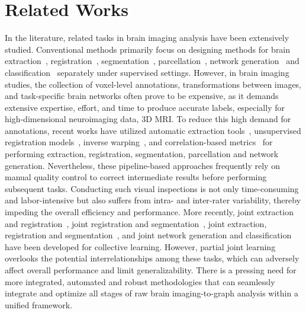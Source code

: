 \section{Related Works}
\label{sec:related}
In the literature, related tasks in brain imaging analysis have been extensively studied. Conventional methods primarily focus on designing methods for brain extraction~\cite{kleesiek2016deep,lucena2019convolutional}, registration~\cite{sokooti2017nonrigid, su2022abn}, segmentation~\cite{akkus2017deep, kamnitsas2017efficient, chen2018voxresnet}, parcellation~\cite{thyreau2020learning,lim2022deepparcellation}, network generation~\cite{vskoch2022human, yin2023multi} and classification~\cite{li2021braingnn,kawahara2017brainnetcnn, kan2022brain} separately under supervised settings. However, in brain imaging studies, the collection of voxel-level annotations, transformations between images, and task-specific brain networks often prove to be expensive, as it demands extensive expertise, effort, and time to produce accurate labels, especially for high-dimensional neuroimaging data, \eg 3D MRI. To reduce this high demand for annotations, recent works have utilized automatic extraction tools~\cite{smith2002fast,cox1996afni,shattuck2002brainsuite, segonne2004hybrid}, unsupervised registration models~\cite{balakrishnan2018unsupervised,su2022abn}, inverse warping~\cite{jaderberg2015spatial}, and correlation-based metrics~\cite{liang2012effects} for performing extraction, registration, segmentation, parcellation and network generation. Nevertheless, these pipeline-based approaches frequently rely on manual quality control to correct intermediate results before performing subsequent tasks. Conducting such visual inspections is not only time-consuming and labor-intensive but also suffers from intra- and inter-rater variability, thereby impeding the overall efficiency and performance. More recently, joint extraction and registration~\cite{su2022ernet}, joint registration and segmentation~\cite{xu2019deepatlas}, joint extraction, registration and segmentation~\cite{su2023one}, and joint network generation and classification~\cite{kan2022fbnetgen} have been developed for collective learning. However, partial joint learning overlooks the potential interrelationships among these tasks, which can adversely affect overall performance and limit generalizability. There is a pressing need for more integrated, automated and robust methodologies that can seamlessly integrate and optimize all stages of raw brain imaging-to-graph analysis within a unified framework.